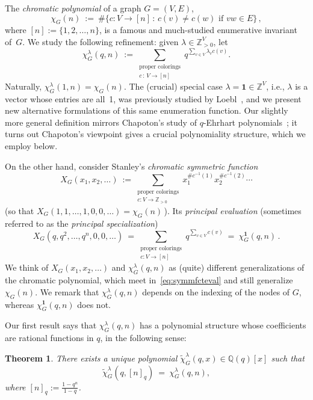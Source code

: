 \documentclass[11pt]{amsart}
\newtheorem{theorem}{Theorem} %
\newcommand\ZZ{\mathbb{Z}}
\newcommand\QQ{\mathbb{Q}}
\newcommand\bone{\mathbf{1}}
\begin{document}
The \emph{chromatic polynomial} of a graph $G=(V,E)$, 
\[
\chi_G(n) \ := \ \#\{c:V\to[n] \, : \, c(v)\neq c(w) \text{ if } vw \in E\} \, ,
\]
where $[n] := \{ 1, 2, \dots, n \}$, is a famous and much-studied enumerative invariant of~$G$. 
We study the following refinement: given $\lambda \in \ZZ_{>0}^V$, let 
\[
\chi_G^\lambda(q,n) \ := \sum_{\substack{\text{proper colorings}\\ c\,:\,V\to[n]}} q^{ \sum_{ v \in V } \lambda_v c(v) }.
\]
Naturally, $\chi_G^\lambda(1,n) = \chi_G(n)$.
The (crucial) special case $\lambda = \bone \in \ZZ^V$, i.e., $\lambda$ is a vector whose entries
are all~1, was previously studied by Loebl~\cite{loebl}, and we present new alternative formulations of this same
enumeration function. 
Our slightly more general definition mirrors Chapoton's study of $q$-Ehrhart polynomials~\cite{Chapoton}; it
turns out Chapoton's viewpoint gives a crucial polynomiality structure, which we employ below. 

On the other hand, consider Stanley's \emph{chromatic symmetric function}~\cite{StanleyChromatic}
\[
X_G(x_1,x_2,\hdots) \ :=\sum_{\substack{\text{proper colorings}\\ c:V\to \ZZ_{
> 0 }}} x_1^{\# c^{-1}(1)}x_2^{\# c^{-1}(2)}\cdots
\]
(so that $X_G(1, 1, \dots, 1, 0, 0, \dots) = \chi_G(n)$\,).
Its \emph{principal evaluation} (sometimes referred to as the \emph{principal specialization})
\begin{equation}\label{eq:symmfcteval}
X_G(q,q^2,\hdots,q^n,0,0,\hdots)
  \ =\sum_{\substack{\text{proper colorings}\\ c:V\to [n]}} q^{\sum_{v \in V} c(v)}
  \ = \ \chi_G^\bone(q,n) \, .
\end{equation}
We think of $X_G(x_1,x_2,\hdots)$ and $\chi_G^\lambda(q,n)$ as (quite) different generalizations of the chromatic polynomial, which meet in~\eqref{eq:symmfcteval} and still generalize $\chi_G(n)$.
We remark that $\chi_G^\lambda(q,n)$ depends on the indexing of the nodes of $G$, whereas $\chi_G^\bone(q,n)$ does not. 

Our first result says that $\chi_G^\lambda(q,n)$ has a polynomial structure whose coefficients are rational functions in $q$, in the following sense:

\begin{theorem}\label{thm:chitildepoly}
There exists a unique polynomial $\widetilde{\chi}_G^\lambda(q,x)\in\QQ(q)[x]$ such that
\[
\widetilde{\chi}_G^\lambda(q,[n]_q) \ = \ \chi_G^\lambda(q,n),
\]
where $[n]_q := \frac{ 1-q^n }{ 1-q }$. 
\end{theorem}
\end{document}
